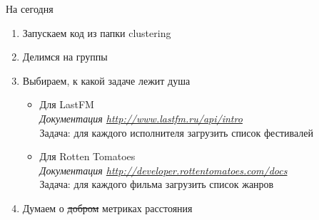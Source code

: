 \documentclass[10pt,a4paper]{beamer}
\begin{document}

\begin{frame}{На сегодня}

\begin{enumerate}
\item Запускаем код из папки clustering
\item Делимся на группы
\item Выбираем, к какой задаче лежит душа
\begin{itemize}
\item Для LastFM \\
{\it Документация \url{http://www.lastfm.ru/api/intro}} \\
Задача: для каждого исполнителя загрузить список фестивалей
\item Для Rotten Tomatoes \\
{\it Документация \url{http://developer.rottentomatoes.com/docs}} \\
Задача: для каждого фильма загрузить список жанров
\end{itemize}
\item Думаем о \sout{добром} метриках расстояния
\end{enumerate}

\end{frame}

\end{document}
